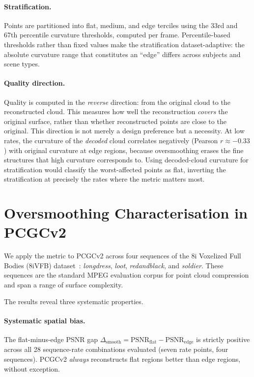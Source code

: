 \paragraph{Stratification.}
Points are partitioned into flat, medium, and edge terciles using the 33rd
and 67th percentile curvature thresholds, computed per frame.
Percentile-based thresholds rather than fixed values make the stratification
dataset-adaptive: the absolute curvature range that constitutes an ``edge''
differs across subjects and scene types.

\paragraph{Quality direction.}
Quality is computed in the \emph{reverse} direction: from the original cloud
to the reconstructed cloud.
This measures how well the reconstruction \emph{covers} the original surface,
rather than whether reconstructed points are close to the original.
This direction is not merely a design preference but a necessity.
At low rates, the curvature of the \emph{decoded} cloud correlates negatively
(Pearson $r \approx -0.33$) with original curvature at edge regions, because
oversmoothing erases the fine structures that high curvature corresponds to.
Using decoded-cloud curvature for stratification would classify the
worst-affected points as flat, inverting the stratification at precisely
the rates where the metric matters most.

\section*{Oversmoothing Characterisation in PCGCv2}

We apply the metric to PCGCv2 across four sequences of the 8i Voxelized Full
Bodies (8iVFB) dataset~\cite{8ivfb}: \textit{longdress}, \textit{loot},
\textit{redandblack}, and \textit{soldier}.
These sequences are the standard MPEG evaluation corpus for point cloud
compression and span a range of surface complexity.

The results reveal three systematic properties.

\paragraph{Systematic spatial bias.}
The flat-minus-edge PSNR gap
$\Delta_{\mathrm{smooth}} = \mathrm{PSNR}_{\mathrm{flat}} - \mathrm{PSNR}_{\mathrm{edge}}$
is strictly positive across all 28 sequence-rate combinations evaluated (seven
rate points, four sequences).
PCGCv2 \emph{always} reconstructs flat regions better than edge regions,
without exception.

